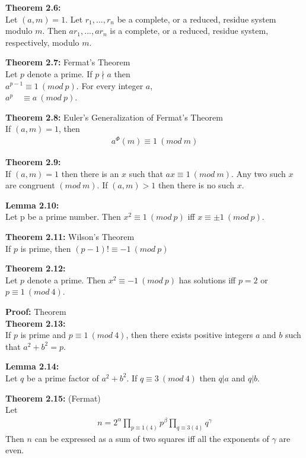 \documentclass[a4paper]{article}
\begin{document}
\textbf{Theorem 2.6:}\\
Let $(a,m)=1$. Let $r_1,...,r_n$ be a complete, or a reduced, residue system modulo $m$. Then $ar_1,...,ar_n$ is a complete, or a reduced, residue system, respectively, modulo $m$.


\textbf{Theorem 2.7:} Fermat's Theorem\\
Let $p$ denote a prime. If $p\nmid a$ then\\
$a^{p-1}\equiv 1\ (mod\ p)$. For every integer $a$,\\
$a^{p}\quad\equiv a\ (mod\ p)$.

\textbf{Theorem 2.8:} Euler's Generalization of Fermat's Theorem\\
If $(a,m)=1$, then
\begin{align}
    a^\Phi(m)\equiv 1\ (mod\ m)
\end{align}

\textbf{Theorem 2.9:}\\
If $(a,m)=1$ then there is an $x$ such that $ax\equiv 1\ (mod\ m)$. Any two such $x$ are congruent $(mod\ m)$. If $(a,m)>1$ then there is no such $x$.

\textbf{Lemma 2.10:}\\
Let p be a prime number. Then $x^2\equiv 1\ (mod\ p)$ iff $x\equiv\pm 1\ (mod\ p)$.

\textbf{Theorem 2.11:} Wilson's Theorem\\
If $p$ is prime, then $(p-1)!\equiv -1\ (mod\ p)$

\textbf{Theorem 2.12:}\\
Let $p$ denote a prime. Then $x^2\equiv -1\ (mod\ p)$ has solutions iff $p=2$ or $p\equiv 1\ (mod\ 4)$.


\textbf{Proof:} Theorem \\

\textbf{Theorem 2.13:}\\
If $p$ is prime and $p\equiv 1\ (mod\ 4)$, then there exists positive integers
$a$ and $b$ such that $a^2+b^2=p$.


\textbf{Lemma 2.14:}\\
Let $q$ be a prime factor of $a^2+b^2$. If $q\equiv 3\ (mod\ 4)$ then $q|a$ and $q|b$.


\textbf{Theorem 2.15:} (Fermat)\\
Let
\begin{align}
    n =  2^\alpha\prod_{p\equiv 1(4)}p^\beta\prod_{q\equiv 3(4)}q^\gamma
\end{align}
Then $n$ can be expressed as a sum of two squares iff all the exponents of $\gamma$ are even.
\end{document}
